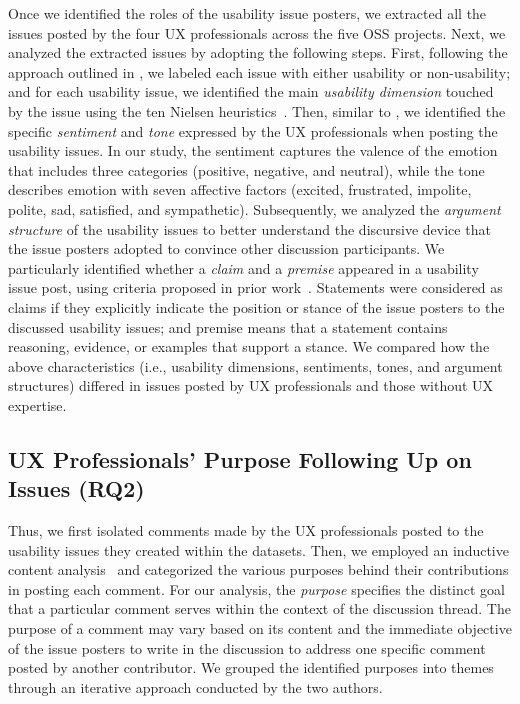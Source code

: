 Once we identified the roles of the usability issue posters, we extracted all the issues posted by the four UX professionals across the five OSS projects. Next, we analyzed the extracted issues by adopting the following steps. First, following the approach outlined in \cite{sanei2023characterizing}, we labeled each issue with either usability or non-usability; and for each usability issue, we identified the main \textit{usability dimension} touched by the issue using the ten Nielsen heuristics~\cite{nielsen2005ten}. Then, similar to \cite{sanei2021impacts}, we identified the specific \textit{sentiment} and \textit{tone} expressed by the UX professionals when posting the usability issues. In our study, the sentiment captures the valence of the emotion that includes three categories (positive, negative, and neutral), while the tone describes emotion with seven affective factors (excited, frustrated, impolite, polite, sad, satisfied, and sympathetic). Subsequently, we analyzed the \textit{argument structure} of the usability issues to better understand the discursive device that the issue posters adopted to convince other discussion participants. We particularly identified whether a \textit{claim} and a \textit{premise} appeared in a usability issue post, using criteria proposed in prior work~\cite{skitalinskaya_learning_2021, wachsmuth_argumentation_2017, dowden1993logical}. Statements were considered as claims if they explicitly indicate the position or stance of the issue posters to the discussed usability issues; and premise means that a statement contains reasoning, evidence, or examples that support a stance. We compared how the above characteristics (i.e., usability dimensions, sentiments, tones, and argument structures) differed in issues posted by UX professionals and those without UX expertise.

\subsection{UX Professionals' Purpose Following Up on Issues (RQ2)}

Thus, we first isolated comments made by the UX professionals posted to the usability issues they created within the datasets. Then, we employed an inductive content analysis~\cite{wamboldt1992content, Hsieh2005} and categorized the various purposes behind their contributions in posting each comment. For our analysis, the \textit{purpose} specifies the distinct goal that a particular comment serves within the context of the discussion thread. The purpose of a comment may vary based on its content and the immediate objective of the issue posters to write in the discussion to address one specific comment posted by another contributor. We grouped the identified purposes into themes through an iterative approach conducted by the two authors.
